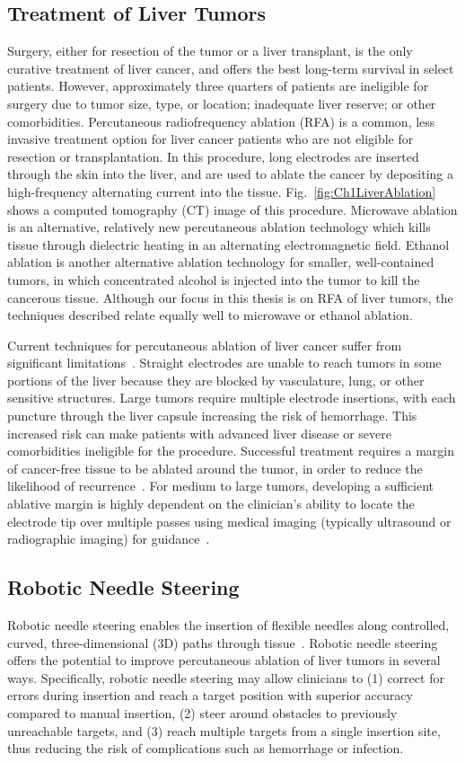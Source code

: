 \subsection{Treatment of Liver Tumors}
Surgery, either for resection of the tumor or a liver transplant, is the only curative treatment of liver cancer, and offers the best long-term survival in select patients. However, approximately three quarters of patients are ineligible for surgery due to tumor size, type, or location; inadequate liver reserve; or other comorbidities. Percutaneous radiofrequency ablation (RFA) is a common, less invasive treatment option for liver cancer patients who are not eligible for resection or transplantation. In this procedure, long electrodes are inserted through the skin into the liver, and are used to ablate the cancer by depositing a high-frequency alternating current into the tissue. Fig.~\ref{fig:Ch1LiverAblation} shows a computed tomography (CT) image of this procedure. Microwave ablation is an alternative, relatively new percutaneous ablation technology which kills tissue through dielectric heating in an alternating electromagnetic field. Ethanol ablation is another alternative ablation technology for smaller, well-contained tumors, in which concentrated alcohol is injected into the tumor to kill the cancerous tissue. Although our focus in this thesis is on RFA of liver tumors, the techniques described relate equally well to microwave or ethanol ablation. 

Current techniques for percutaneous ablation of liver cancer suffer from significant limitations~\cite{Gervais2009}. Straight electrodes are unable to reach tumors in some portions of the liver because they are blocked by vasculature, lung, or other sensitive structures. Large tumors require multiple electrode insertions, with each puncture through the liver capsule increasing the risk of hemorrhage. This increased risk can make patients with advanced liver disease or severe comorbidities ineligible for the procedure. Successful treatment requires a margin of cancer-free tissue to be ablated around the tumor, in order to reduce the likelihood of recurrence~\cite{Kim2006}. For medium to large tumors, developing a sufficient ablative margin is highly dependent on the clinician's ability to locate the electrode tip over multiple passes using medical imaging (typically ultrasound or radiographic imaging) for guidance~\cite{Dodd2001}. 
 
\subsection{Robotic Needle Steering}
Robotic needle steering enables the insertion of flexible needles along controlled, curved, three-dimensional (3D) paths through tissue~\cite{DiMaio2005,Webster2006}. Robotic needle steering offers the potential to improve percutaneous ablation of liver tumors in several ways. Specifically, robotic needle steering may allow clinicians to (1) correct for errors during insertion and reach a target position with superior accuracy compared to manual insertion, (2) steer around obstacles to previously unreachable targets, and (3) reach multiple targets from a single insertion site, thus reducing the risk of complications such as hemorrhage or infection.

